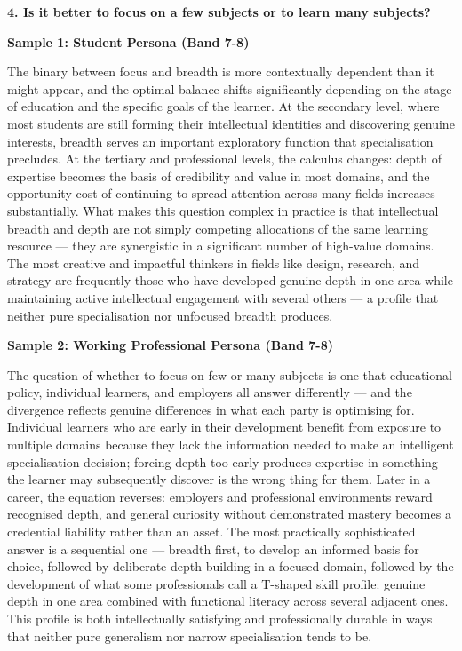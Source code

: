 \separator

\begin{ieltsquestion}
\textbf{4. Is it better to focus on a few subjects or to learn many subjects?}
\end{ieltsquestion}
\textbf{Sample 1: Student Persona (Band 7-8)}

The binary between focus and breadth is more contextually dependent than it might appear, and the optimal balance shifts significantly depending on the stage of education and the specific goals of the learner. At the secondary level, where most students are still forming their intellectual identities and discovering genuine interests, breadth serves an important exploratory function that specialisation precludes. At the tertiary and professional levels, the calculus changes: depth of expertise becomes the basis of credibility and value in most domains, and the opportunity cost of continuing to spread attention across many fields increases substantially. What makes this question complex in practice is that intellectual breadth and depth are not simply competing allocations of the same learning resource — they are synergistic in a significant number of high-value domains. The most creative and impactful thinkers in fields like design, research, and strategy are frequently those who have developed genuine depth in one area while maintaining active intellectual engagement with several others — a profile that neither pure specialisation nor unfocused breadth produces.

\textbf{Sample 2: Working Professional Persona (Band 7-8)}

The question of whether to focus on few or many subjects is one that educational policy, individual learners, and employers all answer differently — and the divergence reflects genuine differences in what each party is optimising for. Individual learners who are early in their development benefit from exposure to multiple domains because they lack the information needed to make an intelligent specialisation decision; forcing depth too early produces expertise in something the learner may subsequently discover is the wrong thing for them. Later in a career, the equation reverses: employers and professional environments reward recognised depth, and general curiosity without demonstrated mastery becomes a credential liability rather than an asset. The most practically sophisticated answer is a sequential one — breadth first, to develop an informed basis for choice, followed by deliberate depth-building in a focused domain, followed by the development of what some professionals call a T-shaped skill profile: genuine depth in one area combined with functional literacy across several adjacent ones. This profile is both intellectually satisfying and professionally durable in ways that neither pure generalism nor narrow specialisation tends to be.

